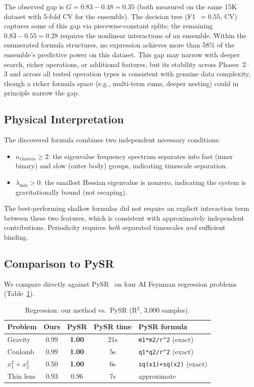 \documentclass[journal]{IEEEtran}
\begin{document}
The observed gap is $G = 0.83 - 0.48 = 0.35$ (both measured on the
same 15K dataset with 5-fold CV for the ensemble). The decision tree
(F1~$= 0.55$, CV) captures some of this gap via piecewise-constant
splits; the remaining $0.83 - 0.55 = 0.28$ requires the nonlinear
interactions of an ensemble. Within the enumerated formula structures,
no expression achieves more than 58\% of the ensemble's predictive
power on this dataset. This gap may narrow with deeper search, richer
operations, or additional features, but its stability across Phases~2--3
and across all tested operation types is consistent with genuine
data complexity, though a richer formula space (e.g., multi-term
sums, deeper nesting) could in principle narrow the gap.

\subsection{Physical Interpretation}

The discovered formula combines two independent necessary conditions:
\begin{itemize}
\item $n_\mathrm{clusters} \geq 2$: the eigenvalue frequency spectrum
separates into fast (inner binary) and slow (outer body) groups,
indicating timescale separation.
\item $\lambda_\mathrm{min} > 0$: the smallest Hessian eigenvalue is
nonzero, indicating the system is gravitationally bound (not
escaping).
\end{itemize}
The best-performing shallow formulas did not require an explicit
interaction term between these two features, which is consistent
with approximately independent contributions. Periodicity requires
\emph{both} separated timescales \emph{and} sufficient binding.

\subsection{Comparison to PySR}

We compare directly against PySR~\cite{cranmer2023interpretable} on
four AI Feynman regression problems (Table~\ref{tab:pysr}).

\begin{table}[h]
\caption{Regression: our method vs.\ PySR (R$^2$, 3{,}000 samples).}
\label{tab:pysr}
\scriptsize
\begin{tabular}{@{}lcccl@{}}
\toprule
Problem & Ours & PySR & PySR time & PySR formula \\
\midrule
Gravity & 0.99 & \textbf{1.00} & 21s & \texttt{m1*m2/r\^{}2} (exact) \\
Coulomb & 0.99 & \textbf{1.00} & 5s & \texttt{q1*q2/r\^{}2} (exact) \\
$x_1^2{+}x_2^2$ & 0.50 & \textbf{1.00} & 6s & \texttt{sq(x1)+sq(x2)} (exact) \\
Thin lens & 0.93 & 0.96 & 7s & approximate \\
\bottomrule
\end{tabular}
\end{table}
\end{document}
